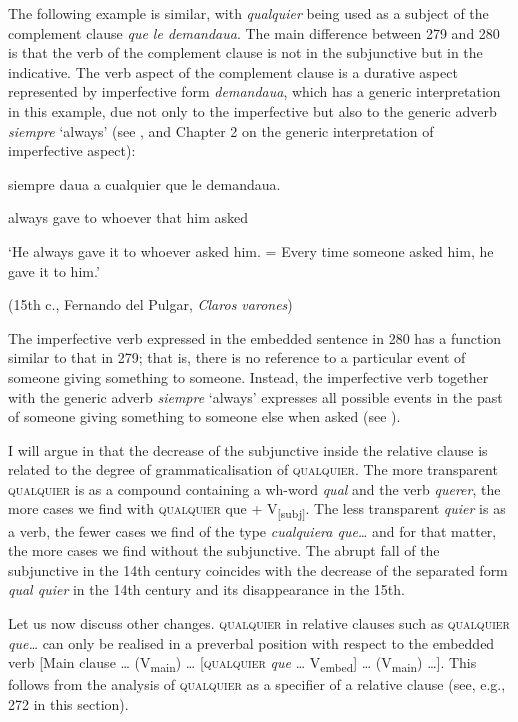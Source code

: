 \documentclass[output=paper]{langscibook}
\begin{document}
  The following example is similar, with \textit{qualquier} being used as a subject of the complement clause \textit{que le demandaua}. The main difference between 279 and 280 is that the verb of the complement clause is not in the subjunctive but in the indicative. The verb aspect of the complement clause is a durative aspect represented by imperfective form \textit{demandaua}, which has a generic interpretation in this example, due not only to the imperfective but also to the generic adverb \textit{siempre} ‘always’ (see \citealt{Quer2000}, and Chapter 2 on the generic interpretation of imperfective aspect):

  siempre   daua  a  cualquier  que  le  demandaua.

  always  gave  to  whoever  that  him  asked

  ‘He always gave it to whoever asked him. = Every time someone asked him, he gave it to him.’

  (15th c., Fernando del Pulgar, \textit{Claros varones})

The imperfective verb expressed in the embedded sentence in 280 has a function similar to that in 279; that is, there is no reference to a particular event of someone giving something to someone. Instead, the imperfective verb together with the generic adverb \textit{siempre} ‘always’ expresses all possible events in the past of someone giving something to someone else when asked (see \citealt{Becker2014}).

  I will argue in  that the decrease of the subjunctive inside the relative clause is related to the degree of grammaticalisation of \textsc{qualquier}. The more transparent \textsc{qualquier} is as a compound containing a wh-word \textit{qual} and the verb \textit{querer}, the more cases we find with \textsc{qualquier} que + V\textsubscript{[subj]}. The less transparent \textit{quier} is as a verb, the fewer cases we find of the type \textit{cualquiera que…} and for that matter, the more cases we find without the subjunctive. The abrupt fall of the subjunctive in the 14th century coincides with the decrease of the separated form \textit{qual quier} in the 14th century and its disappearance in the 15th.

  Let us now discuss other changes. \textsc{qualquier} in relative clauses such as \textsc{qualquier} \textit{que…} can only be realised in a preverbal position with respect to the embedded verb [Main clause … (V\textsubscript{main}) … [\textsc{qualquier} \textit{que} … V\textsubscript{embed}] … (V\textsubscript{main}) …]. This follows from the analysis of \textsc{qualquier} as a specifier of a relative clause (see, e.g., 272 in this section).
\end{document}
